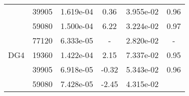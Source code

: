 \begin{table}
\begin{center}
{\begin{tabular}{| l | c | c | c | c | c |}
            &39905
            
                &1.619e-04
                
                &0.36
                
                &3.955e-02
                
                &0.96\\
                
            &59080
            
                &1.500e-04
                
                &6.22
                
                &3.224e-02
                
                &0.97\\
                
            &77120
            
                &6.333e-05
                
                &-
                
                &2.820e-02
                
                &-\\
                \hline
        \hline
        \hspace{0.1cm}DG4\hspace{0.1cm}    
        
            &19360
            
                &1.422e-04
                
                &2.15
                
                &7.337e-02
                
                &0.95\\
                
            &39905
            
                &6.918e-05
                
                &-0.32
                
                &5.343e-02
                
                &0.96\\
                
            &59080
            
                &7.428e-05
                
                &-2.45
                
                &4.315e-02
                

\end{tabular}}
\end{center}
\end{table}
